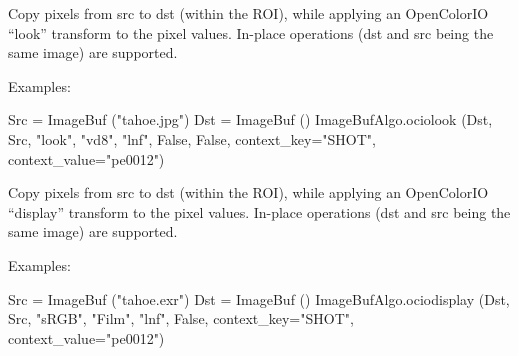  
Copy pixels from {\cf src} to {\cf dst} (within the ROI), while
applying an OpenColorIO ``look'' transform to the pixel values.
In-place operations ({\cf dst} and {\cf src} being the same image)
are supported.

\smallskip
\noindent Examples:
\begin{code}
    Src = ImageBuf ("tahoe.jpg")
    Dst = ImageBuf ()
    ImageBufAlgo.ociolook (Dst, Src, "look", "vd8", "lnf", False, False,
                            context_key="SHOT", context_value="pe0012")
\end{code}
\apiend


 
Copy pixels from {\cf src} to {\cf dst} (within the ROI), while
applying an OpenColorIO ``display'' transform to the pixel values.
In-place operations ({\cf dst} and {\cf src} being the same image)
are supported.

\smallskip
\noindent Examples:
\begin{code}
    Src = ImageBuf ("tahoe.exr")
    Dst = ImageBuf ()
    ImageBufAlgo.ociodisplay (Dst, Src, "sRGB", "Film", "lnf", False,
                              context_key="SHOT", context_value="pe0012")
\end{code}
\apiend



